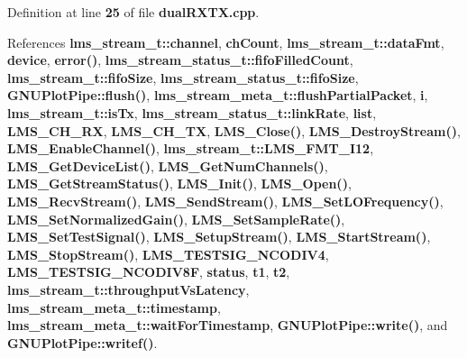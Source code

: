 Definition at line {\bf 25} of file {\bf dual\+R\+X\+T\+X.\+cpp}.



References {\bf lms\+\_\+stream\+\_\+t\+::channel}, {\bf ch\+Count}, {\bf lms\+\_\+stream\+\_\+t\+::data\+Fmt}, {\bf device}, {\bf error()}, {\bf lms\+\_\+stream\+\_\+status\+\_\+t\+::fifo\+Filled\+Count}, {\bf lms\+\_\+stream\+\_\+t\+::fifo\+Size}, {\bf lms\+\_\+stream\+\_\+status\+\_\+t\+::fifo\+Size}, {\bf G\+N\+U\+Plot\+Pipe\+::flush()}, {\bf lms\+\_\+stream\+\_\+meta\+\_\+t\+::flush\+Partial\+Packet}, {\bf i}, {\bf lms\+\_\+stream\+\_\+t\+::is\+Tx}, {\bf lms\+\_\+stream\+\_\+status\+\_\+t\+::link\+Rate}, {\bf list}, {\bf L\+M\+S\+\_\+\+C\+H\+\_\+\+RX}, {\bf L\+M\+S\+\_\+\+C\+H\+\_\+\+TX}, {\bf L\+M\+S\+\_\+\+Close()}, {\bf L\+M\+S\+\_\+\+Destroy\+Stream()}, {\bf L\+M\+S\+\_\+\+Enable\+Channel()}, {\bf lms\+\_\+stream\+\_\+t\+::\+L\+M\+S\+\_\+\+F\+M\+T\+\_\+\+I12}, {\bf L\+M\+S\+\_\+\+Get\+Device\+List()}, {\bf L\+M\+S\+\_\+\+Get\+Num\+Channels()}, {\bf L\+M\+S\+\_\+\+Get\+Stream\+Status()}, {\bf L\+M\+S\+\_\+\+Init()}, {\bf L\+M\+S\+\_\+\+Open()}, {\bf L\+M\+S\+\_\+\+Recv\+Stream()}, {\bf L\+M\+S\+\_\+\+Send\+Stream()}, {\bf L\+M\+S\+\_\+\+Set\+L\+O\+Frequency()}, {\bf L\+M\+S\+\_\+\+Set\+Normalized\+Gain()}, {\bf L\+M\+S\+\_\+\+Set\+Sample\+Rate()}, {\bf L\+M\+S\+\_\+\+Set\+Test\+Signal()}, {\bf L\+M\+S\+\_\+\+Setup\+Stream()}, {\bf L\+M\+S\+\_\+\+Start\+Stream()}, {\bf L\+M\+S\+\_\+\+Stop\+Stream()}, {\bf L\+M\+S\+\_\+\+T\+E\+S\+T\+S\+I\+G\+\_\+\+N\+C\+O\+D\+I\+V4}, {\bf L\+M\+S\+\_\+\+T\+E\+S\+T\+S\+I\+G\+\_\+\+N\+C\+O\+D\+I\+V8F}, {\bf status}, {\bf t1}, {\bf t2}, {\bf lms\+\_\+stream\+\_\+t\+::throughput\+Vs\+Latency}, {\bf lms\+\_\+stream\+\_\+meta\+\_\+t\+::timestamp}, {\bf lms\+\_\+stream\+\_\+meta\+\_\+t\+::wait\+For\+Timestamp}, {\bf G\+N\+U\+Plot\+Pipe\+::write()}, and {\bf G\+N\+U\+Plot\+Pipe\+::writef()}.



